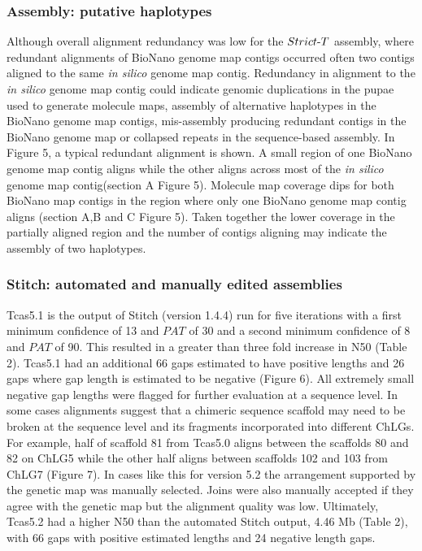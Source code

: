 \documentclass{bmcart}
\begin{document}
\subsubsection*{Assembly: putative haplotypes}

Although overall alignment redundancy was low for the $Strict\textnormal{-}T$ assembly, where redundant alignments of BioNano genome map contigs occurred often two contigs aligned to the same \textit{in silico} genome map contig. Redundancy in alignment to the \textit{in silico} genome map contig could indicate genomic duplications in the pupae used to generate molecule maps, assembly of alternative haplotypes in the BioNano genome map contigs, mis-assembly producing redundant contigs in the BioNano genome map or collapsed repeats in the sequence-based assembly. In Figure 5, a typical redundant alignment is shown. A small region of one BioNano genome map contig aligns while the other aligns across most of the \textit{in silico} genome map contig(section A Figure 5). Molecule map coverage dips for both BioNano map contigs in the region where only one BioNano genome map contig aligns (section A,B and C Figure 5). Taken together the lower coverage in the partially aligned region and the number of contigs aligning may indicate the assembly of two haplotypes. 

\subsubsection*{Stitch: automated and manually edited assemblies}

Tcas5.1 is the output of Stitch (version 1.4.4) run for five iterations with a first minimum confidence of 13 and $PAT$ of 30 and a second minimum confidence of 8 and $PAT$ of 90. This resulted in a greater than three fold increase in N50 (Table 2). Tcas5.1 had an additional 66 gaps estimated to have positive lengths and 26 gaps where gap length is estimated to be negative (Figure 6). All extremely small negative gap lengths were flagged for further evaluation at a sequence level. In some cases alignments suggest that a chimeric sequence scaffold may need to be broken at the sequence level and its fragments incorporated into different ChLGs. For example, half of scaffold 81 from Tcas5.0 aligns between the scaffolds 80 and 82 on ChLG5 while the other half aligns between scaffolds 102 and 103 from ChLG7 (Figure 7). In cases like this for version 5.2 the arrangement supported by the genetic map was manually selected. Joins were also manually accepted if they agree with the genetic map but the alignment quality was low. Ultimately, Tcas5.2 had a higher N50 than the automated Stitch output, 4.46 Mb (Table 2), with 66 gaps with positive estimated lengths and 24 negative length gaps. 
\end{document}
